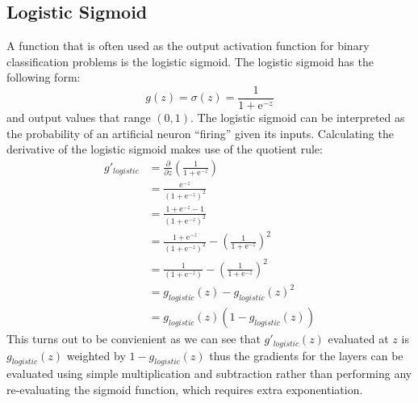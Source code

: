 \subsection{Logistic Sigmoid}
A function that is often used as the output activation function for binary classification problems is the logistic sigmoid. The logistic sigmoid has the following form:
\begin{equation}
g(z) = \sigma (z) = \frac{1}{1 + \mathrm{e}^{-z}}
\end{equation}
and output values that range $(0,1)$. The logistic sigmoid can be interpreted as the probability of an artificial neuron ``firing'' given its inputs. Calculating the derivative of the logistic sigmoid makes use of the quotient rule:
\begin{equation}
\begin{split}
g'_{logistic} &= \frac{\partial}{\partial z}(\frac{1}{1+\mathrm{e}^{-z}})\\
          &= \frac{\mathrm{e}^{-z}}{(1+\mathrm{e}^{-z})^2}\\
          &= \frac{1 + \mathrm{e}^{-z} -1}{(1+\mathrm{e}^{-z})^2} \\
          &= \frac{1 + \mathrm{e}^{-z}}{(1+\mathrm{e}^{-z})^2} - (\frac{1}{1 + \mathrm{e}^{-z}})^2\\
          &= \frac{1}{(1+\mathrm{e}^{-z})} - (\frac{1}{1 + \mathrm{e}^{-z}})^2\\
          &= g_{logistic}(z) - g_{logistic}(z)^2\\
          &= g_{logistic}(z)(1 - g_{logistic}(z))
\end{split}
\end{equation}
This turns out to be convienient as we can see that $g'_{logistic}(z)$ evaluated at $z$ is $g_{logistic}(z)$ weighted by  $1-g_{logistic}(z)$ thus the gradients for the layers can be evaluated using simple multiplication and subtraction rather than performing any re-evaluating the sigmoid function, which requires extra exponentiation.\\
